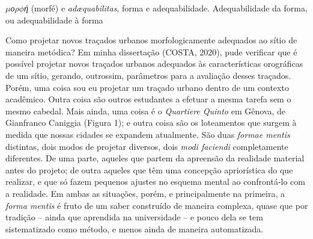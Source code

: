 \documentclass[twoside, 12pt, english,italian,latin,greek,french,spanish,brazil]{book}
\begin{document}

        \textit{$\mu$ο$\rho\phi$ή} (morfé) e \textit{adæquabilitas}, forma e adequabilidade.
    Adequabilidade da forma, ou adequabilidade à forma

        Como projetar novos traçados urbanos morfologicamente adequados ao sítio de maneira metódica? Em minha dissertação (COSTA, 2020), pude verificar que é possível projetar novos traçados urbanos adequados às características orográficas de um sítio, gerando, outrossim, parâmetros para a avaliação desses traçados. Porém, uma coisa sou eu projetar um traçado urbano dentro de um contexto acadêmico. Outra coisa são outros estudantes a efetuar a mesma tarefa sem o mesmo cabedal. Mais ainda, uma coisa é o \textit{Quartiere Quinto} em Gênova, de Gianfranco Caniggia (Figura 1); e outra coisa são os loteamentos que surgem à medida que nossas cidades se expandem atualmente. São duas \textit{formae mentis} distintas, dois modos de projetar diversos, dois \textit{modi faciendi} completamente diferentes. De uma parte, aqueles que partem da apreensão da realidade material antes do projeto;  de outra aqueles que têm uma concepção apriorística do que realizar, e que só fazem pequenos ajustes no esquema mental ao confrontá-lo com a realidade. Em ambas as situações, porém, e principalmente na primeira, a \textit{forma mentis} é fruto de um saber construído de maneira complexa, quase que por tradição – ainda que aprendida na universidade – e pouco dela se tem sistematizado como método, e menos ainda de maneira automatizada. 
\end{document}
